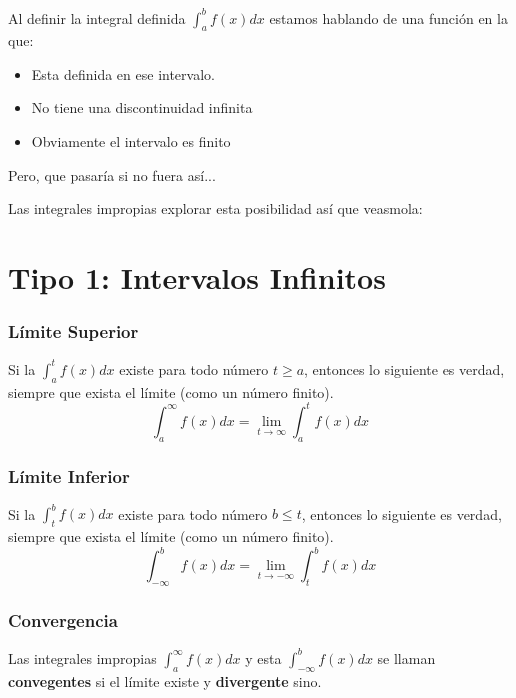 \documentclass[12pt, fleqn]{report}                             %
\theoremstyle{break}                                            %
\begin{document}
            Al definir la integral definida $\int_a^b f(x) dx$ estamos hablando
            de una función en la que:

            \begin{itemize}
                \item Esta definida en ese intervalo.
                \item No tiene una discontinuidad infinita
                \item Obviamente el intervalo es finito
            \end{itemize}

            Pero, que pasaría si no fuera así...

            Las integrales impropias explorar esta posibilidad así que veasmola:

        \clearpage
        \section{Tipo 1: Intervalos Infinitos}

            \subsubsection{Límite Superior}
            Si la $\int_a^t f(x) dx$ existe para todo número $t \geq a$, entonces
            lo siguiente es verdad, siempre que exista el límite (como un número finito).
            \begin{equation}
                \int_a^{\infty} f(x) dx = \lim_{t \to \infty} \int_a^t f(x) dx
            \end{equation}

            \subsubsection{Límite Inferior}
            Si la $\int_t^b f(x) dx$ existe para todo número $b \leq t$, entonces lo
            siguiente es verdad, siempre que exista el límite (como un número finito).
            \begin{equation}
                \int_{- \infty}^b f(x) dx = \lim_{t \to - \infty} \int_t^b f(x) dx
            \end{equation}

            \subsubsection{Convergencia}
            Las integrales impropias $\int_a^{\infty}f(x)dx$ y esta $\int_{-\infty}^bf(x)dx$
            se llaman \textbf{convegentes} si el límite existe y  \textbf{divergente} sino.
\end{document}

